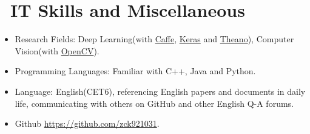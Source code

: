 \documentclass{resume}
\begin{document}
\section{\faCogs\ IT Skills and Miscellaneous}
\begin{itemize}[parsep=0.5ex]
	\item Research Fields: Deep Learning(with \href{http://caffe.berkeleyvision.org/}{Caffe}, \href{https://keras.io/}{Keras} and \href{http://deeplearning.net/software/theano/}{Theano}), Computer Vision(with \href{http://opencv.org/}{OpenCV}).
	\item Programming Languages: Familiar with C++, Java and Python.
  \item Language: English(CET6), referencing English papers and documents in daily life, communicating with others on GitHub and other English Q-A forums.
  \item \faGithub Github \href{https://github.com/zck921031}{https://github.com/zck921031}.
\end{itemize}
%
%
\end{document}
